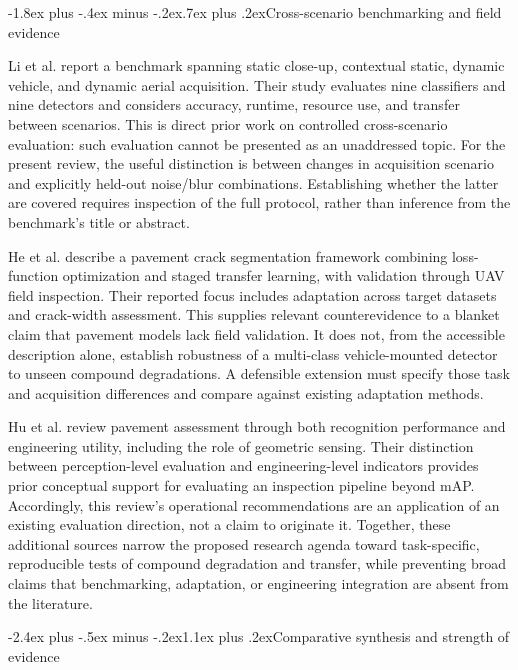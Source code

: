 \documentclass[11pt,a4paper]{article}
\makeatletter
\renewcommand\section{\@startsection{section}{1}{\z@}%
  {-2.4ex plus -.5ex minus -.2ex}{1.1ex plus .2ex}{\normalfont\large\bfseries}}
\renewcommand\subsection{\@startsection{subsection}{2}{\z@}%
  {-1.8ex plus -.4ex minus -.2ex}{.7ex plus .2ex}{\normalfont\normalsize\bfseries}}
\makeatother
\begin{document}
\subsection{Cross-scenario benchmarking and field evidence}
\label{sec:extended}

Li et al. \cite{r10} report a benchmark spanning static close-up, contextual static, dynamic vehicle, and dynamic aerial acquisition. Their study evaluates nine classifiers and nine detectors and considers accuracy, runtime, resource use, and transfer between scenarios. This is direct prior work on controlled cross-scenario evaluation: such evaluation cannot be presented as an unaddressed topic. For the present review, the useful distinction is between changes in acquisition scenario and explicitly held-out noise/blur combinations. Establishing whether the latter are covered requires inspection of the full protocol, rather than inference from the benchmark's title or abstract.

He et al. \cite{r11} describe a pavement crack segmentation framework combining loss-function optimization and staged transfer learning, with validation through UAV field inspection. Their reported focus includes adaptation across target datasets and crack-width assessment. This supplies relevant counterevidence to a blanket claim that pavement models lack field validation. It does not, from the accessible description alone, establish robustness of a multi-class vehicle-mounted detector to unseen compound degradations. A defensible extension must specify those task and acquisition differences and compare against existing adaptation methods.

Hu et al. \cite{r12} review pavement assessment through both recognition performance and engineering utility, including the role of geometric sensing. Their distinction between perception-level evaluation and engineering-level indicators provides prior conceptual support for evaluating an inspection pipeline beyond mAP. Accordingly, this review's operational recommendations are an application of an existing evaluation direction, not a claim to originate it. Together, these additional sources narrow the proposed research agenda toward task-specific, reproducible tests of compound degradation and transfer, while preventing broad claims that benchmarking, adaptation, or engineering integration are absent from the literature.

\section{Comparative synthesis and strength of evidence}
\end{document}
